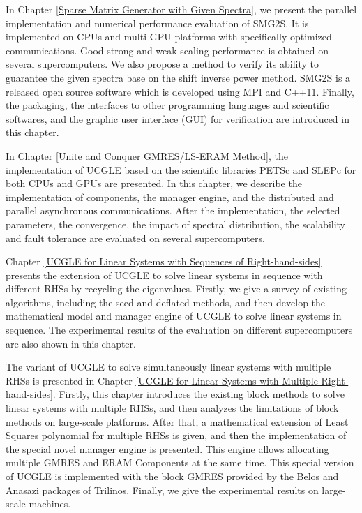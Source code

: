 
In Chapter \ref{Sparse Matrix Generator with Given Spectra}, we present the parallel implementation and numerical performance evaluation of SMG2S. It is implemented on CPUs and multi-GPU platforms with specifically optimized communications. Good strong and weak scaling performance is obtained on several supercomputers. We also propose a method to verify its ability to guarantee the given spectra base on the shift inverse power method. SMG2S is a released open source software which is developed using MPI and C++11. Finally, the packaging, the interfaces to other programming languages and scientific softwares, and the graphic user interface (GUI) for verification are introduced in this chapter.

In Chapter \ref{Unite and Conquer GMRES/LS-ERAM Method}, the implementation of UCGLE based on the scientific libraries PETSc and SLEPc for both CPUs and GPUs are presented. In this chapter, we describe the implementation of components, the manager engine, and the distributed and parallel asynchronous communications. After the implementation, the selected parameters, the convergence, the impact of spectral distribution, the scalability and fault tolerance are evaluated on several supercomputers.

Chapter \ref{UCGLE for Linear Systems with Sequences of Right-hand-sides} presents the extension of UCGLE to solve linear systems in sequence with different RHSs by recycling the eigenvalues. Firstly, we give a survey of existing algorithms, including the seed and deflated methods, and then develop the mathematical model and manager engine of UCGLE to solve linear systems in sequence. The experimental results of the evaluation on different supercomputers are also shown in this chapter.

The variant of UCGLE to solve simultaneously linear systems with multiple RHSs is presented in Chapter \ref{UCGLE for Linear Systems with Multiple Right-hand-sides}. Firstly, this chapter introduces the existing block methods to solve linear systems with multiple RHSs, and then analyzes the limitations of block methods on large-scale platforms. After that, a mathematical extension of Least Squares polynomial for multiple RHSs is given, and then the implementation of the special novel manager engine is presented. This engine allows allocating multiple GMRES and ERAM Components at the same time. This special version of UCGLE is implemented with the block GMRES provided by the Belos and Anasazi packages of Trilinos. Finally, we give the experimental results on large-scale machines.

